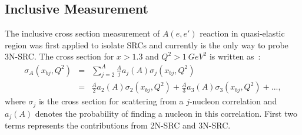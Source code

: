 \subsection{Inclusive Measurement}
The inclusive cross section measurement of $A(e,e')$ reaction in quasi-elastic region was first applied to isolate SRCs and currently is the only way to probe 3N-SRC. The cross section for $x>1.3$ and $Q^{2}>1~GeV^{2}$ is written as~\cite{Frankfurt1988235}:
\begin{eqnarray}
  \sigma_{A}(x_{bj},Q^{2}) &=& \sum_{j=2}^{A}\frac{A}{j} a_{j}(A) \sigma_{j}(x_{bj},Q^{2}) \nonumber \\
  &=& \frac{A}{2}a_{2}(A)\sigma_{2}(x_{bj},Q^{2})+\frac{A}{3}a_{3}(A)\sigma_{3}(x_{bj},Q^{2})+...,
  \label{xs_src_inclusive}
\end{eqnarray}
where $\sigma_{j}$ is the cross section for scattering from a $j$-nucleon correlation and $a_{j}(A)$ denotes the probability of finding a nucleon in this correlation. First two terms represents the contributions from 2N-SRC and 3N-SRC. 

